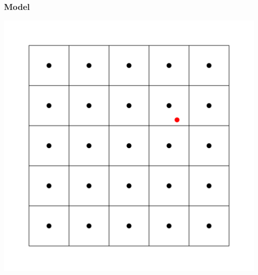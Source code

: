 \documentclass[10pt, compress]{beamer}
\begin{document}
  \begin{frame}
    \frametitle{Model}
    \centering
    \includegraphics[height=0.8\textheight]{grid_spot.pdf}
  \end{frame}
  
\end{document}
